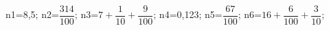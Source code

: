 \documentclass[exercice]{thedocument}%
\begin{document}
%
    \>n1={8,5};%
    \>n2=$\dfrac{314}{100}$;%
    \>n3=$7+\dfrac1{10}+\dfrac9{100}$;%
    \>n4={0,123};%
    \>n5=$\dfrac{67}{100}$;%
    \>n6=$16+\dfrac6{100}+\dfrac3{10}$;%
\end{document}
